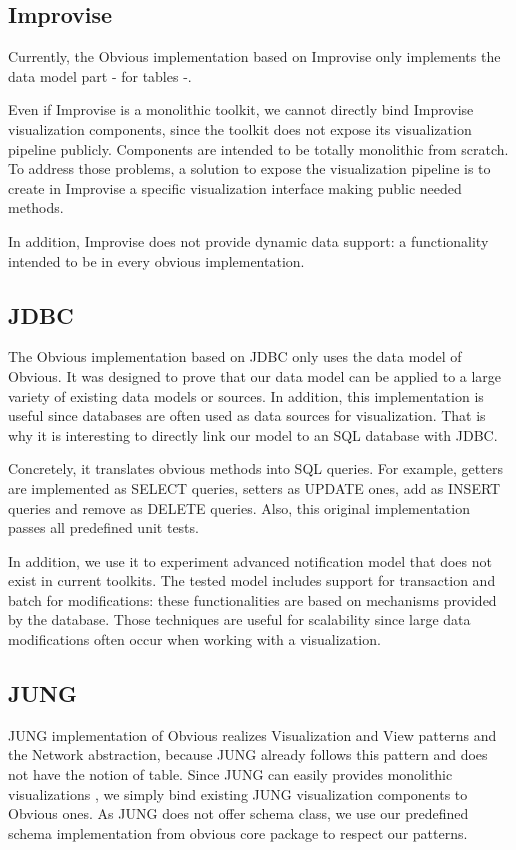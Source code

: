 \subsection{Improvise}

Currently, the Obvious implementation based on Improvise only implements the data model part - for tables -.

Even if Improvise is a monolithic toolkit, we cannot directly bind Improvise visualization components, since the toolkit does not expose its visualization pipeline publicly. Components are intended to be totally monolithic from scratch. To address those problems, a solution to expose the visualization pipeline is to create in Improvise a specific visualization interface making public needed methods.

In addition, Improvise does not provide dynamic data support: a functionality intended to be in every obvious implementation.

\subsection{JDBC}

The Obvious implementation based on JDBC only uses the data model of Obvious. It was designed to prove that our data model can be applied to a large variety of existing data models or sources. In addition, this implementation is useful since databases are often used as data sources for visualization. That is why it is interesting to directly link our model to an SQL database with JDBC.

Concretely, it  translates obvious methods into SQL queries. For example, getters are implemented as SELECT queries, setters as UPDATE ones, add as INSERT queries and remove as DELETE queries. Also, this original implementation passes all predefined unit tests.

In addition, we use it to experiment advanced notification model  that does not exist in current toolkits. The tested model includes support for transaction and batch for modifications: these functionalities are based on mechanisms provided by the database. Those techniques are useful for scalability since large data modifications often occur when working with a visualization.

\subsection{JUNG}

JUNG implementation of Obvious realizes Visualization and View patterns and the Network abstraction, because JUNG already follows this pattern and does not have the notion of table. Since JUNG can easily provides monolithic visualizations , we simply bind existing JUNG visualization components to Obvious ones. As JUNG does not offer schema class, we use our predefined schema implementation from obvious core package to respect our patterns.

